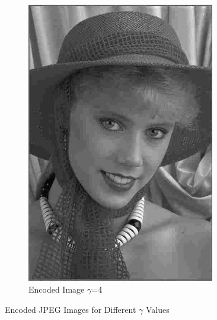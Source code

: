 \documentclass{article}
\begin{document}
\begin{figure}[!htb]
\begin{subfigure}{0.33\textwidth}
					\includegraphics[width=0.9\textwidth]{img03y_3.jpeg}
					\caption{Encoded Image $\gamma$=4}
				\end{subfigure}
				\caption{Encoded JPEG Images for Different $\gamma$ Values}
			\end{figure}
\end{document}
